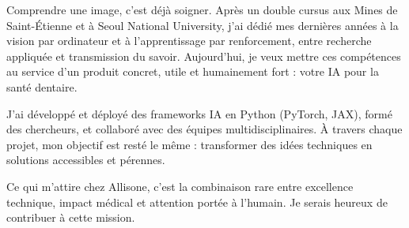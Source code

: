 
\newcommand{\Company}{Allisone}
\recipient{\RecruitmentTeam{\Company}}{\Company\\Paris\\France}
\makelettertitle
Comprendre une image, c’est déjà soigner. Après un double cursus aux Mines de Saint-Étienne et à Seoul National University, j’ai dédié mes dernières années à la vision par ordinateur et à l’apprentissage par renforcement, entre recherche appliquée et transmission du savoir. Aujourd’hui, je veux mettre ces compétences au service d’un produit concret, utile et humainement fort : votre IA pour la santé dentaire.

J’ai développé et déployé des frameworks IA en Python (PyTorch, JAX), formé des chercheurs, et collaboré avec des équipes multidisciplinaires. À travers chaque projet, mon objectif est resté le même : transformer des idées techniques en solutions accessibles et pérennes.

Ce qui m’attire chez Allisone, c’est la combinaison rare entre excellence technique, impact médical et attention portée à l’humain. Je serais heureux de contribuer à cette mission.

\makeletterclosing
